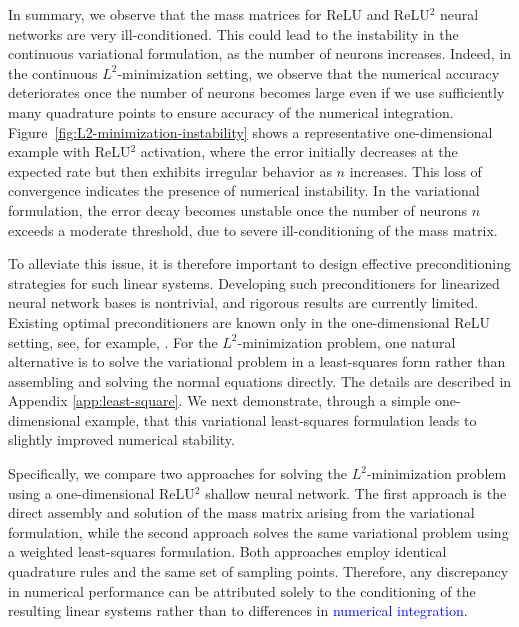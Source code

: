 \documentclass{article}
\theoremstyle{remark}
\begin{document}
In summary, we observe that the mass matrices for ReLU and ReLU$^2$ neural networks are very ill-conditioned. 
This could lead to the instability in the continuous variational formulation, as the number of neurons increases. 
Indeed, in the continuous $L^2$-minimization setting, we observe that the numerical accuracy 
deteriorates once the number of neurons becomes large even if we use sufficiently many quadrature points to ensure accuracy of the numerical integration.  
Figure~\ref{fig:L2-minimization-instability} shows a representative one-dimensional example 
with ReLU$^2$ activation, where the error initially decreases at the expected rate but 
then exhibits irregular behavior as $n$ increases. 
This loss of convergence indicates the presence of numerical instability.
In the variational formulation, the error decay becomes unstable once the number of neurons $n$ exceeds a moderate threshold, due to severe ill-conditioning of the mass matrix. 

To alleviate this issue, it is therefore important to design effective preconditioning strategies for such linear systems. 
Developing such preconditioners for linearized neural network bases is nontrivial, and rigorous results are currently limited. Existing optimal preconditioners are known only in the one-dimensional ReLU setting, see, for example, \cite{PXX:2022}.
For the $L^2$-minimization problem, one natural alternative is to solve the variational problem in a least-squares form rather than assembling and solving the normal equations directly.
The details are described in Appendix \ref{app:least-square}.
We next demonstrate, through a simple one-dimensional example, that this variational least-squares formulation leads to slightly improved numerical stability.

Specifically, we compare two approaches for solving the $L^2$-minimization problem using a one-dimensional ReLU$^2$ shallow neural network. The first approach is the direct assembly and
solution of the mass matrix arising from the variational formulation, while the second approach
solves the same variational problem using a weighted least-squares formulation. Both approaches
employ identical quadrature rules and the same set of sampling points. Therefore, any discrepancy
in numerical performance can be attributed solely to the conditioning of the resulting linear
systems rather than to differences in \textcolor{blue}{numerical integration}.
\end{document}
